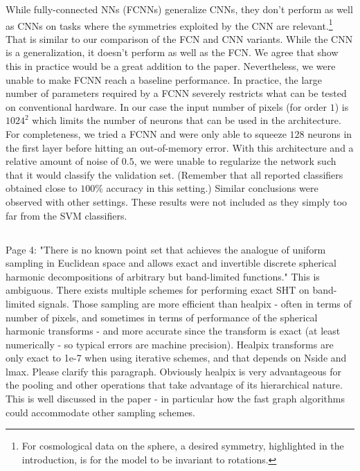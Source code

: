 \documentclass[12pt,a4paper]{article}
\newcommand{\1}{\b{1}}              %
\newcommand{\0}{\b{0}}              %
\begin{document}
While fully-connected NNs (FCNNs) generalize CNNs, they don't perform as well as CNNs on tasks where the symmetries exploited by the CNN are relevant.\footnote{For cosmological data on the sphere, a desired symmetry, highlighted in the introduction, is for the model to be invariant to rotations.}
That is similar to our comparison of the FCN and CNN variants.
While the CNN is a generalization, it doesn't perform as well as the FCN. We agree that show this in practice would be a great addition to the paper. Nevertheless, we were unable to make FCNN reach a baseline performance.
In practice, the large number of parameters required by a FCNN severely restricts what can be tested on conventional hardware. In our case the input number of pixels (for order $1$) is $1024^2$ which limits the number of neurons that can be used in the architecture. For completeness, we tried a FCNN and were only able to squeeze $128$ neurons in the first layer before hitting an out-of-memory error. With this architecture and a relative amount of noise of $0.5$, we were unable to regularize the network such that it would classify the validation set. (Remember that all reported classifiers obtained close to $100\%$ accuracy in this setting.) Similar conclusions were observed with other settings. These results were not included as they simply too far from the SVM classifiers. 


\subsection{}
\begin{mdframed}[style=comment]
Page 4: "There is no known point set that achieves the analogue of uniform sampling in Euclidean space and allows exact and invertible discrete spherical harmonic decompositions of arbitrary but band-limited functions." This is ambiguous. There exists multiple schemes for performing exact SHT on band-limited signals. Those sampling are more efficient than healpix - often in terms of number of pixels, and sometimes in terms of performance of the spherical harmonic transforms - and more accurate since the transform is exact (at least numerically - so typical errors are machine precision). Healpix transforms are only exact to 1e-7 when using iterative schemes, and that depends on Nside and lmax. Please clarify this paragraph. Obviously healpix is very advantageous for the pooling and other operations that take advantage of its hierarchical nature. This is well discussed in the paper - in particular how the fast graph algorithms could accommodate other sampling schemes.
\end{mdframed}
\end{document}
